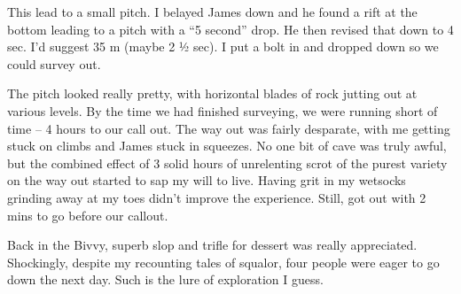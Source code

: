 This lead to a small pitch. I belayed James down and he found a rift at
the bottom leading to a pitch with a ``5 second'' drop. He then revised
that down to 4 sec. I'd suggest 35 m (maybe 2 ½ sec). I put a bolt in
and dropped down so we could survey out.


The  pitch looked really pretty, with horizontal
blades of rock jutting out at various levels. By the time we had
finished surveying, we were running short of time -- 4 hours to our call
out. The way out was fairly desparate, with me getting stuck on climbs
and James stuck in squeezes. No one bit of cave was truly awful, but the
combined effect of 3 solid hours of unrelenting scrot of the purest
variety on the way out started to sap my will to live. Having grit in my
wetsocks grinding away at my toes didn't improve the experience. Still,
got out with 2 mins to go before our callout.

Back in the Bivvy, superb slop and trifle for dessert was really
appreciated. Shockingly, despite my recounting tales of squalor, four
people were eager to go down the next day. Such is the lure of
exploration I guess.






